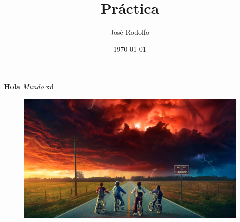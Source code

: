 \documentclass[a4paper]{article}
\title{Práctica}
\author{José Rodolfo}
\date{\today}
\begin{document}
  \maketitle
  \textbf{Hola} \textit{Mundo} \underline{xd}
  \begin{figure}
    \centering
    \includegraphics[width=\textwidth]{img/stranger-things.jpg}
    \label{fig:ejemplo}
  \end{figure}
\end{document}
